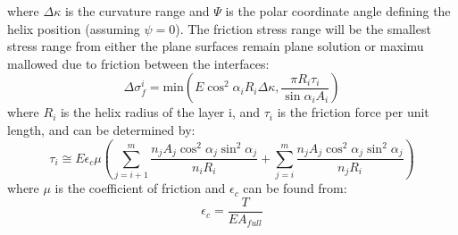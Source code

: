 where $\Delta \kappa$ is the curvature range and $\Psi$ is the polar coordinate angle defining the helix position (assuming $\psi=0$). \newline
\newline
The friction stress range will be the smallest stress range from either the plane surfaces remain plane solution or maximu mallowed due to friction between the interfaces:
\begin{equation}
    \Delta \sigma_f^i =\text{min}\left(E \cos^2 \alpha_i R_i \Delta \kappa , \frac{\pi R_i \tau_i}{\sin \alpha_i A_i}\right)
\end{equation}
where $R_i$ is the helix radius of the layer i, and $\tau_i$ is the friction force per unit length, and can be determined by:
\begin{equation}
    \tau_i \cong E \epsilon_c \mu \left( \sum_{j=i+1}^m \frac{n_j A_j \cos^2 \alpha_j \sin^2 \alpha_j }{n_i R_i} + \sum_{j=i}^m \frac{n_j A_j \cos^2 \alpha_j  \sin^2 \alpha_j}{n_j R_i}\right)
\end{equation}
where $\mu$ is the coefficient of friction and $\epsilon_c$ can be found from:
\begin{equation}
    \epsilon_c =\frac{T}{EA_{full}}
    \label{eq:stressvariation2}
\end{equation}